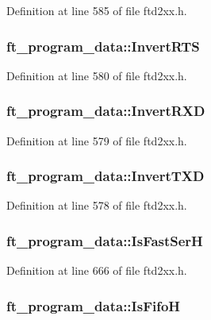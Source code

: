 Definition at line 585 of file ftd2xx.h.\hypertarget{structft__program__data_a709debf56fb2654291febd83d6e23161}{
\subsubsection[{InvertRTS}]{ {\bf ft\_\-program\_\-data::InvertRTS}}}
\label{structft__program__data_a709debf56fb2654291febd83d6e23161}


Definition at line 580 of file ftd2xx.h.\hypertarget{structft__program__data_ad39202e4a8f2d3ed219b9853d7cdad19}{
\subsubsection[{InvertRXD}]{ {\bf ft\_\-program\_\-data::InvertRXD}}}
\label{structft__program__data_ad39202e4a8f2d3ed219b9853d7cdad19}


Definition at line 579 of file ftd2xx.h.\hypertarget{structft__program__data_a0d2de447606e38c05a02701aada981cf}{
\subsubsection[{InvertTXD}]{ {\bf ft\_\-program\_\-data::InvertTXD}}}
\label{structft__program__data_a0d2de447606e38c05a02701aada981cf}


Definition at line 578 of file ftd2xx.h.\hypertarget{structft__program__data_a445221508c1c077d30621dfe20316f59}{
\subsubsection[{IsFastSerH}]{ {\bf ft\_\-program\_\-data::IsFastSerH}}}
\label{structft__program__data_a445221508c1c077d30621dfe20316f59}


Definition at line 666 of file ftd2xx.h.\hypertarget{structft__program__data_a38ce59e2b1723db2d14addfceecabecb}{
\subsubsection[{IsFifoH}]{ {\bf ft\_\-program\_\-data::IsFifoH}}}
\label{structft__program__data_a38ce59e2b1723db2d14addfceecabecb}


